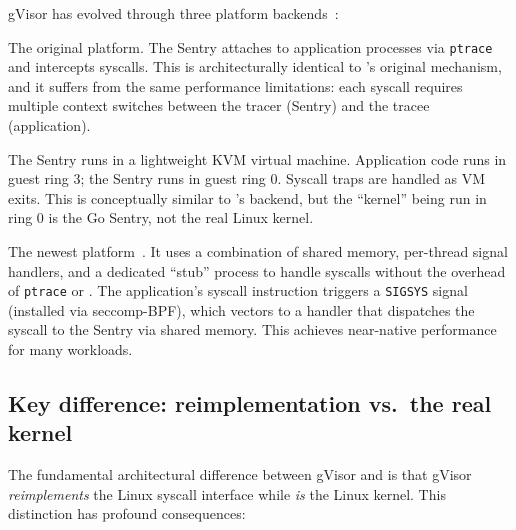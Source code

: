 gVisor has evolved through three platform backends~\cite{gvisor-platforms}:

\begin{description}[style=nextline,leftmargin=2em]
  \item[ptrace (2018).]
    The original platform.  The Sentry attaches to application
    processes via \texttt{ptrace} and intercepts syscalls.  This is
    architecturally identical to \UML{}'s original mechanism, and it
    suffers from the same performance limitations: each syscall
    requires multiple context switches between the tracer (Sentry)
    and the tracee (application).

  \item[KVM (2018).]
    The Sentry runs in a lightweight KVM virtual machine.
    Application code runs in guest ring 3; the Sentry runs in guest
    ring 0.  Syscall traps are handled as VM exits.  This is
    conceptually similar to \UML{}'s \KVMvTwo{} backend, but the
    ``kernel'' being run in ring 0 is the Go Sentry, not the real
    Linux kernel.

  \item[Systrap (2023).]
    The newest platform~\cite{gvisor-systrap}.  It uses a combination
    of shared memory, per-thread signal handlers, and a dedicated
    ``stub'' process to handle syscalls without the overhead of
    \texttt{ptrace} or \KVM{}.  The application's syscall instruction
    triggers a \texttt{SIGSYS} signal (installed via seccomp-BPF),
    which vectors to a handler that dispatches the syscall to the
    Sentry via shared memory.  This achieves near-native performance
    for many workloads.
\end{description}

\subsection{Key difference: reimplementation vs.\ the real kernel}

The fundamental architectural difference between gVisor and \UML{}
is that gVisor \emph{reimplements} the Linux syscall interface while
\UML{} \emph{is} the Linux kernel.  This distinction has profound
consequences:

